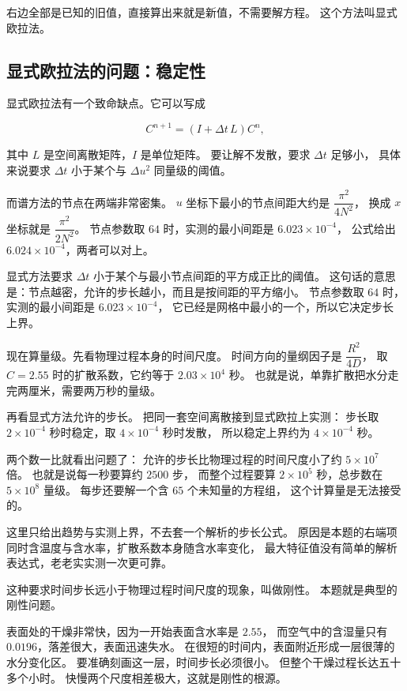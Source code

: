 右边全部是已知的旧值，直接算出来就是新值，不需要解方程。
这个方法叫显式欧拉法。

\subsection{显式欧拉法的问题：稳定性}

显式欧拉法有一个致命缺点。它可以写成

\begin{equation}
C^{n+1} = \left(I+\Delta t\,L\right)C^{n},
\end{equation}

其中 $L$ 是空间离散矩阵，$I$ 是单位矩阵。
要让解不发散，要求 $\Delta t$ 足够小，
具体来说要求 $\Delta t$ 小于某个与 $\Delta u^2$ 同量级的阈值。

而谱方法的节点在两端非常密集。
$u$ 坐标下最小的节点间距大约是 $\dfrac{\pi^2}{4N^2}$，
换成 $x$ 坐标就是 $\dfrac{\pi^2}{2N^2}$。
节点参数取 $64$ 时，实测的最小间距是 $6.023\times10^{-4}$，
公式给出 $6.024\times10^{-4}$，两者可以对上。

显式方法要求 $\Delta t$ 小于某个与最小节点间距的平方成正比的阈值。
这句话的意思是：节点越密，允许的步长越小，而且是按间距的平方缩小。
节点参数取 $64$ 时，实测的最小间距是 $6.023\times10^{-4}$，
它已经是网格中最小的一个，所以它决定步长上界。

现在算量级。先看物理过程本身的时间尺度。
时间方向的量纲因子是 $\dfrac{R^2}{4D}$，
取 $C=2.55$ 时的扩散系数，它约等于 $2.03\times10^4$ 秒。
也就是说，单靠扩散把水分走完两厘米，需要两万秒的量级。

再看显式方法允许的步长。
把同一套空间离散接到显式欧拉上实测：
步长取 $2\times10^{-4}$ 秒时稳定，取 $4\times10^{-4}$ 秒时发散，
所以稳定上界约为 $4\times10^{-4}$ 秒。

两个数一比就看出问题了：
允许的步长比物理过程的时间尺度小了约 $5\times10^7$ 倍。
也就是说每一秒要算约 $2500$ 步，
而整个过程要算 $2\times10^5$ 秒，总步数在 $5\times10^8$ 量级。
每步还要解一个含 $65$ 个未知量的方程组，
这个计算量是无法接受的。

这里只给出趋势与实测上界，不去套一个解析的步长公式。
原因是本题的右端项同时含温度与含水率，扩散系数本身随含水率变化，
最大特征值没有简单的解析表达式，老老实实测一次更可靠。

这种要求时间步长远小于物理过程时间尺度的现象，叫做刚性。
本题就是典型的刚性问题。

表面处的干燥非常快，因为一开始表面含水率是 $2.55$，
而空气中的含湿量只有 $0.0196$，落差很大，表面迅速失水。
在很短的时间内，表面附近形成一层很薄的水分变化区。
要准确刻画这一层，时间步长必须很小。
但整个干燥过程长达五十多个小时。
快慢两个尺度相差极大，这就是刚性的根源。

